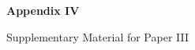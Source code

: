 \documentclass[
  10pt,
]{scrbook}
\let\originaltextbf\textbf
\renewcommand{\textbf}[1]{\textcolor{color1}{\textsf{\originaltextbf{#1}}}}
\begin{document}


\begin{center}

\textbf{\textsf{\Huge Appendix IV}}


\label{app:paper3supp}


\vspace{1cm}

\textsf{\Huge Supplementary Material for Paper III}

\end{center}




\backmatter
\end{document}
